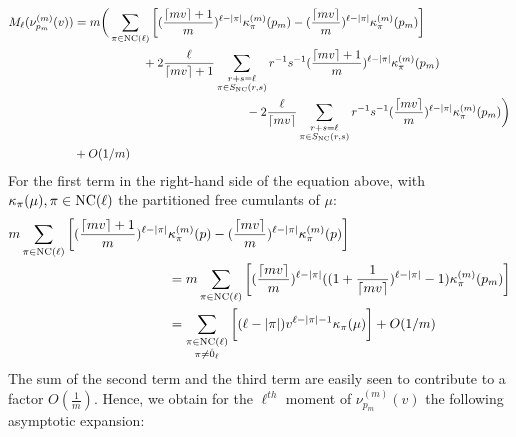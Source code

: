 \documentclass[12pt,reqno]{amsart}
\newcommand{\ceil}[1]{\lceil {#1} \rceil}
\begin{document}
	\begin{align*}
		M_{\ell}(\nu^{(m)}_{p_m}(v)) & = m\bigg(\sum_{\pi \in {\rm NC }(\ell)} \bigg[(\frac{\ceil{mv}+1}{m})^{\ell-|\pi|}\kappa^{(m)}_{\pi}(p_m) - (\frac{\ceil{mv}}{m})^{\ell-|\pi|}\kappa_{\pi}^{(m)}(p_m)\bigg] \\
		                             & \hspace{2cm}+ 2\frac{\ell}{\ceil{mv}+1}\sum_{\substack{r+s = \ell                                                                                                      \\ \pi \in S_{{\rm NC }}(r,s)}} r^{-1}s^{-1}(\frac{\ceil{mv}+1}{m})^{\ell-|\pi|}\kappa^{(m)}_{\pi}(p_m) \\
		                             & \hspace{5cm}- 2\frac{\ell}{\ceil{mv}}\sum_{\substack{r+s = \ell                                                                                                        \\ \pi \in S_{{\rm NC }}(r,s)}} r^{-1}s^{-1}(\frac{\ceil{mv}}{m})^{\ell-|\pi|}\kappa_{\pi}^{(m)}(p_m) \bigg)  \\
		                             & + O(1/m)
	\end{align*}
	For the first term in the right-hand side of the equation above, with $\kappa_{\pi}(\mu),\pi \in {\rm {\rm NC }}(\ell)$ the partitioned free cumulants of $\mu$:
	\begin{align*}
		m\sum_{\pi \in {\rm NC }(\ell)} \bigg[(\frac{\ceil{mv}+1}{m})^{\ell-|\pi|} & \kappa^{(m)}_{\pi}(p) - (\frac{\ceil{mv}}{m})^{\ell-|\pi|}\kappa_{\pi}^{(m)}(p)\bigg]                                                    \\
		                                                                    & = m\sum_{\pi \in {\rm NC }(\ell)} \bigg[(\frac{\ceil{mv}}{m})^{\ell-|\pi|}((1+\frac{1}{\ceil{mv}})^{\ell-|\pi|}-1)\kappa^{(m)}_{\pi}(p_m)\bigg] \\
		                                                                    & = \sum_{\substack{\pi \in {\rm NC }(\ell)                                                                                                       \\ \pi \neq \hat{0}_{\ell}}} \bigg[(\ell-|\pi|)v^{\ell-|\pi|-1}\kappa_{\pi}(\mu)\bigg] + O(1/m)
	\end{align*}
	The sum of the second term and the third term are easily seen to contribute to a factor $O(\frac{1}{m})$. Hence, we obtain for the $\ell^{th}$ moment of $\nu_{p_m}^{(m)}(v)$ the following asymptotic expansion:
\end{document}
